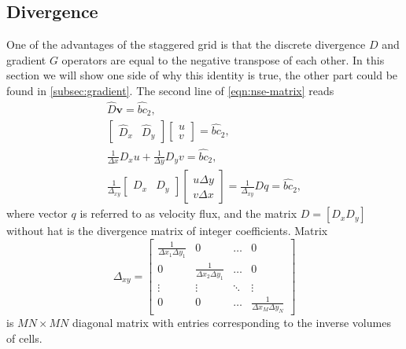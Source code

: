 \documentclass{article}
\numberwithin{equation}{section}
\begin{document}
\subsection{Divergence}\label{subsec:divergence}

One of the advantages of the staggered grid is that the discrete divergence $D$ and gradient $G$ operators are equal to the negative transpose of each other. 
In this section we will show one side of why this identity is true, the other part could be found in \cref{subsec:gradient}.
The second line of \cref{eqn:nse-matrix} reads
\begin{equation*}
\begin{gathered}
\hat{D}\boldsymbol{v}=\hat{bc}_2,\\
\left[ 
\begin{array}{ll}
\hat{D}_x & \hat{D}_y 	
\end{array}
\right]\left[\begin{array}{l}
u\\
v
\end{array}
\right]=\hat{bc}_2
, \\
\frac{1}{\Delta x} D_x u+\frac{1}{\Delta y} D_y v=\hat{bc}_2, \\
\frac{1}{\Delta _{xy}}\left[\begin{array}{ll}
D_x & D_y
\end{array}\right]\left[\begin{array}{l}
u \Delta y \\
v \Delta x
\end{array}\right]=\frac{1}{\Delta _{xy}} D q=\hat{bc}_2,
\end{gathered}
\end{equation*}
where vector $q$ is referred to as velocity flux, and the matrix $D=[D_x D_y]$ without hat is the divergence matrix of integer coefficients. Matrix
\begin{equation}\label{eqn:delta-xy}
	\Delta _{xy}=
	\begin{bmatrix}{}
		\frac{1}{\Delta x_1\Delta y_1}		&0	&\dots	&0\\
		0		&\frac{1}{\Delta x_2\Delta y_1}	&\dots	&0\\
		\vdots		&\vdots	&\ddots	&\vdots\\
		0		&0	&\dots	&\frac{1}{\Delta x_M\Delta y_N}
	\end{bmatrix}
\end{equation}
is $MN\times MN$ diagonal matrix with entries corresponding to the inverse volumes of cells. 
\end{document}
